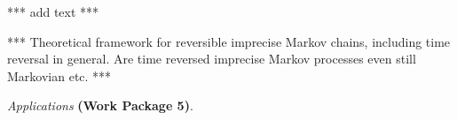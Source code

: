 \documentclass[11pt,dvipsnames,usenames,a4paper]{article}
\begin{document}
%
%	
%

*** add text ***

*** Theoretical framework for reversible imprecise Markov chains, including time reversal in general. Are time reversed imprecise Markov processes even still Markovian etc. ***




\vspace{5pt}
\emph{Applications} {\bf (Work Package 5)}.
\vspace{3pt}
\end{document}
